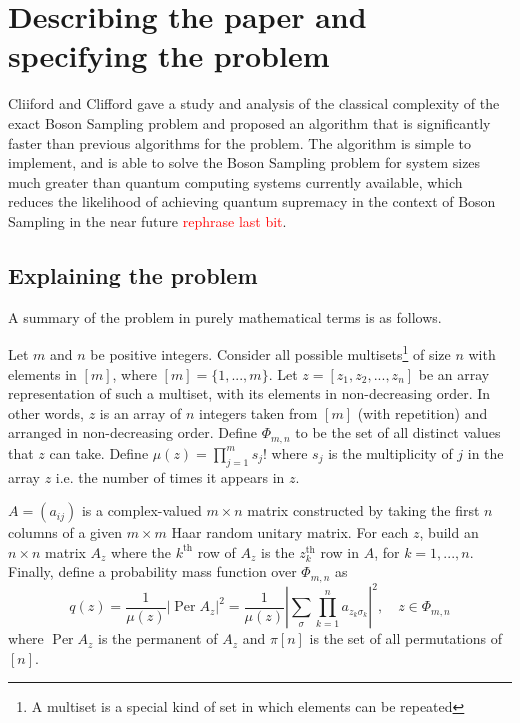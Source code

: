 \documentclass[11pt]{article}
\theoremstyle{theorem}
\theoremstyle{remark}
\theoremstyle{plain}
\theoremstyle{definition}
\DeclareMathOperator*{\Per}{\mathrm{Per}}
\begin{document}
\section{Describing the paper and specifying the problem} %
Cliiford and Clifford \cite{clifford17} gave a study and analysis of the classical complexity of the exact Boson Sampling problem and proposed an algorithm that is significantly faster than previous algorithms for the problem. The algorithm is simple to implement, and is able to solve the Boson Sampling problem for system sizes much greater than quantum computing systems currently available, which reduces the likelihood of achieving quantum supremacy in the context of Boson Sampling in the near future \textcolor{red}{rephrase last bit}.

\subsection{Explaining the problem}
A summary of the problem in purely mathematical terms is as follows. 

Let $m$ and $n$ be positive integers. Consider all possible multisets\footnote{A multiset is a special kind of set in which elements can be repeated} of size $n$ with elements in $[m]$, where $[m] = \{1, ... , m\}$. Let $z = [z_1, z_2, ... , z_n]$ be an array representation of such a multiset, with its elements in non-decreasing order. In other words, $z$ is an array of $n$ integers taken from $[m]$ (with repetition) and arranged in non-decreasing order. Define $\Phi_{m,n}$ to be the set of all distinct values that $z$ can take. Define $\mu(z) = \prod_{j=1}^m s_j !$ where $s_j$ is the multiplicity of $j$ in the array $z$ i.e. the number of times it appears in $z$.

$A = (a_{ij})$ is a complex-valued $m \times n$ matrix constructed by taking the first $n$ columns of a given $m \times m$ Haar random unitary matrix. For each $z$, build an $n \times n$ matrix $A_z$ where the $k^{\text{th}}$ row of $A_z$ is the $z_k^{\text{th}}$ row in $A$, for $k = 1, ... , n$. Finally, define a probability mass function over $\Phi_{m,n}$  as
\begin{equation}\label{boson_sampling_formula1}
q (z) = \frac{1}{\mu(z)} \left|\Per A_z \right| ^2 = \frac{1}{\mu(z)}  \left|\sum_{\sigma} \prod_{k=1}^n a_{z_k \sigma_k}\right|^2, \quad z \in \Phi_{m,n}
\end{equation}
where $\Per A_z$ is the permanent of $A_z$ and $\pi[n]$ is the set of all permutations of $[n]$.
\end{document}
